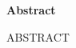 \thispagestyle{empty}
\begin{center} 
    \vspace{1.0cm}
    \textbf{\LARGE Abstract}
\end{center}

ABSTRACT